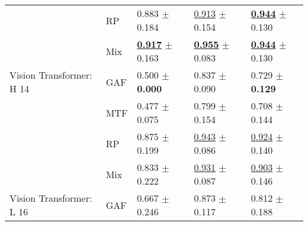 \begin{tabular}{lllll}
 & RP & \textcolor[rgb]{0.0758620690,0.5000000000,0}{0.883} $\pm$ \textcolor[rgb]{0.7142262542,0.2857737458,0}{0.184} & \underline{\textcolor[rgb]{0.2262044653,0.5000000000,0}{0.913}} $\pm$ \textcolor[rgb]{0.8514875126,0.1485124874,0}{0.154} & \underline{\textbf{\textcolor[rgb]{0.0000000000,0.5000000000,0}{0.944}}} $\pm$ \textcolor[rgb]{0.0065585724,0.5000000000,0}{0.130} \\
 & Mix & \underline{\textbf{\textcolor[rgb]{0.0000000000,0.5000000000,0}{0.917}}} $\pm$ \textcolor[rgb]{0.6327066559,0.3672933441,0}{0.163} & \underline{\textbf{\textcolor[rgb]{0.0000000000,0.5000000000,0}{0.955}}} $\pm$ \textcolor[rgb]{0.0919331644,0.5000000000,0}{0.083} & \underline{\textbf{\textcolor[rgb]{0.0000000000,0.5000000000,0}{0.944}}} $\pm$ \textcolor[rgb]{0.0065585724,0.5000000000,0}{0.130} \\
Vision Transformer: H 14 & GAF & \textcolor[rgb]{0.9482758621,0.0517241379,0}{0.500} $\pm$ \textbf{\textcolor[rgb]{0.0000000000,0.5000000000,0}{0.000}} & \textcolor[rgb]{0.6376811594,0.3623188406,0}{0.837} $\pm$ \textcolor[rgb]{0.1621370367,0.5000000000,0}{0.090} & \textcolor[rgb]{0.9117647059,0.0882352941,0}{0.729} $\pm$ \textbf{\textcolor[rgb]{0.0000000000,0.5000000000,0}{0.129}} \\
 & MTF & \textcolor[rgb]{1.0000000000,0.0000000000,0}{0.477} $\pm$ \textcolor[rgb]{0.2928862697,0.5000000000,0}{0.075} & \textcolor[rgb]{0.8444966706,0.1555033294,0}{0.799} $\pm$ \textcolor[rgb]{0.8574926851,0.1425073149,0}{0.154} & \textcolor[rgb]{1.0000000000,0.0000000000,0}{0.708} $\pm$ \textcolor[rgb]{0.1005729181,0.5000000000,0}{0.144} \\
 & RP & \textcolor[rgb]{0.0948275862,0.5000000000,0}{0.875} $\pm$ \textcolor[rgb]{0.7749042320,0.2250957680,0}{0.199} & \underline{\textcolor[rgb]{0.0646298472,0.5000000000,0}{0.943}} $\pm$ \textcolor[rgb]{0.1253430190,0.5000000000,0}{0.086} & \underline{\textcolor[rgb]{0.0882352941,0.5000000000,0}{0.924}} $\pm$ \textcolor[rgb]{0.0707312682,0.5000000000,0}{0.140} \\
 & Mix & \textcolor[rgb]{0.1896551724,0.5000000000,0}{0.833} $\pm$ \textcolor[rgb]{0.8622338316,0.1377661684,0}{0.222} & \underline{\textcolor[rgb]{0.1292596945,0.5000000000,0}{0.931}} $\pm$ \textcolor[rgb]{0.1387548389,0.5000000000,0}{0.087} & \underline{\textcolor[rgb]{0.1764705882,0.5000000000,0}{0.903}} $\pm$ \textcolor[rgb]{0.1099220919,0.5000000000,0}{0.146} \\
Vision Transformer: L 16 & GAF & \textcolor[rgb]{0.5689655172,0.4310344828,0}{0.667} $\pm$ \textcolor[rgb]{0.9565625511,0.0434374489,0}{0.246} & \textcolor[rgb]{0.4437916177,0.5000000000,0}{0.873} $\pm$ \textcolor[rgb]{0.4595868089,0.5000000000,0}{0.117} & \textcolor[rgb]{0.5588235294,0.4411764706,0}{0.812} $\pm$ \textcolor[rgb]{0.3848316167,0.5000000000,0}{0.188} \\

\end{tabular}
